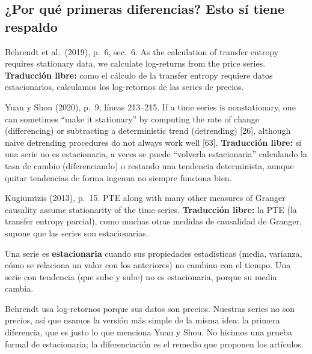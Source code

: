 \documentclass[11pt,openany]{book}
\begin{document}
\subsection*{¿Por qué primeras diferencias? Esto sí tiene respaldo}

\begin{cita}{Behrendt et al.\ (2019), p.~6, sec.~6.}
As the calculation of transfer entropy requires stationary data, we calculate log-returns from the price series.
\tcblower
\textbf{Traducción libre:} como el cálculo de la transfer entropy requiere datos estacionarios, calculamos los log-retornos de las series de precios.
\end{cita}

\begin{cita}{Yuan y Shou (2020), p.~9, líneas 213--215.}
If a time series is nonstationary, one can sometimes “make it stationary” by computing the rate of change (differencing) or subtracting a deterministic trend (detrending) [26], although naive detrending procedures do not always work well [63].
\tcblower
\textbf{Traducción libre:} si una serie no es estacionaria, a veces se puede ``volverla estacionaria'' calculando la tasa de cambio (diferenciando) o restando una tendencia determinista, aunque quitar tendencias de forma ingenua no siempre funciona bien.
\end{cita}

\begin{cita}{Kugiumtzis (2013), p.~15.}
PTE along with many other measures of Granger causality assume stationarity of the time series.
\tcblower
\textbf{Traducción libre:} la PTE (la transfer entropy parcial), como muchas otras medidas de causalidad de Granger, supone que las series son estacionarias.
\end{cita}

\begin{nota}
Una serie es \textbf{estacionaria} cuando sus propiedades estadísticas (media, varianza, cómo se relaciona un valor con los anteriores) no cambian con el tiempo. Una serie con tendencia (que sube y sube) no es estacionaria, porque su media cambia.
\end{nota}

\begin{ojo}
Behrendt usa log-retornos porque sus datos son precios. Nuestras series no son precios, así que usamos la versión más simple de la misma idea: la primera diferencia, que es justo lo que menciona Yuan y Shou. No hicimos una prueba formal de estacionaria; la diferenciación es el remedio que proponen los artículos.
\end{ojo}
\end{document}
